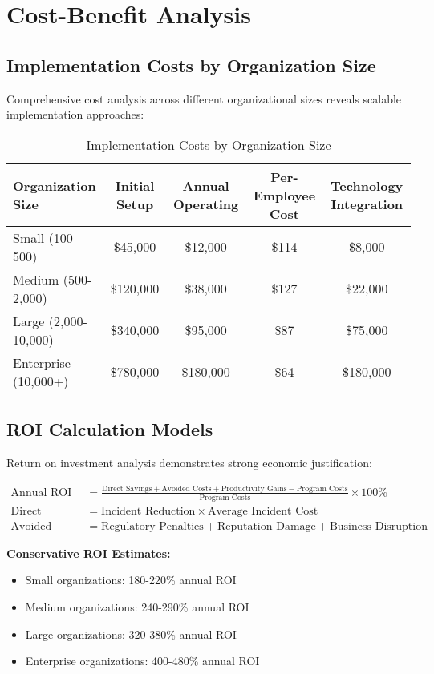 \documentclass[11pt,a4paper]{article}
\begin{document}
\section{Cost-Benefit Analysis}

\subsection{Implementation Costs by Organization Size}

Comprehensive cost analysis across different organizational sizes reveals scalable implementation approaches:

\begin{table}[H]
\centering
\caption{Implementation Costs by Organization Size}
\label{tab:implementation_costs}
\begin{tabular}{lcccc}
\toprule
Organization Size & Initial Setup & Annual Operating & Per-Employee Cost & Technology Integration \\
\midrule
Small (100-500) & \$45,000 & \$12,000 & \$114 & \$8,000 \\
Medium (500-2,000) & \$120,000 & \$38,000 & \$127 & \$22,000 \\
Large (2,000-10,000) & \$340,000 & \$95,000 & \$87 & \$75,000 \\
Enterprise (10,000+) & \$780,000 & \$180,000 & \$64 & \$180,000 \\
\bottomrule
\end{tabular}
\end{table}

\FloatBarrier

\subsection{ROI Calculation Models}

Return on investment analysis demonstrates strong economic justification:

\begin{align}
\text{Annual ROI} &= \frac{\text{Direct Savings} + \text{Avoided Costs} + \text{Productivity Gains} - \text{Program Costs}}{\text{Program Costs}} \times 100\% \\
\text{Direct Savings} &= \text{Incident Reduction} \times \text{Average Incident Cost} \\
\text{Avoided Costs} &= \text{Regulatory Penalties} + \text{Reputation Damage} + \text{Business Disruption}
\end{align}

\textbf{Conservative ROI Estimates:}
\begin{itemize}
\item Small organizations: 180-220\% annual ROI
\item Medium organizations: 240-290\% annual ROI
\item Large organizations: 320-380\% annual ROI
\item Enterprise organizations: 400-480\% annual ROI
\end{itemize}
\end{document}
